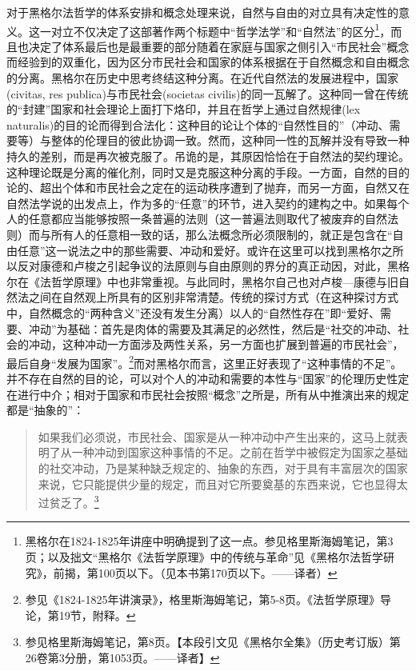 对于黑格尔法哲学的体系安排和概念处理来说，自然与自由的对立具有决定性的意义。这一对立不仅决定了这部著作两个标题中“哲学法学”和“自然法”的区分\footnote{黑格尔在1824-1825年讲座中明确提到了这一点。参见格里斯海姆笔记，第3页；以及拙文“黑格尔《法哲学原理》中的传统与革命”见《黑格尔法哲学研究》，前揭，第100页以下。（见本书第170页以下。——译者）}，而且也决定了体系最后也是最重要的部分随着在家庭与国家之侧引入“市民社会”概念而经验到的双重化，因为区分市民社会和国家的体系根据在于自然概念和自由概念的分离。黑格尔在历史中思考终结这种分离。在近代自然法的发展进程中，国家(civitas, res publica)与市民社会(societas civilis)的同一瓦解了。这种同一曾在传统的“封建”国家和社会理论上面打下烙印，并且在哲学上通过自然规律(lex naturalis)的目的论而得到合法化：这种目的论让个体的“自然性目的”（冲动、需要等）与整体的伦理目的彼此协调一致。然而，这种同一性的瓦解并没有导致一种持久的差别，而是再次被克服了。吊诡的是，其原因恰恰在于自然法的契约理论。这种理论既是分离的催化剂，同时又是克服这种分离的手段。一方面，自然的目的论的、超出个体和市民社会之定在的运动秩序遭到了抛弃，而另一方面，自然又在自然法学说的出发点上，作为多的“任意”的环节，进入契约的建构之中。如果每个人的任意都应当能够按照一条普遍的法则（这一普遍法则取代了被废弃的自然法则）而与所有人的任意相一致的话，那么法概念所必须限制的，就正是包含在“自由任意”这一说法之中的那些需要、冲动和爱好。或许在这里可以找到黑格尔之所以反对康德和卢梭之引起争议的法原则与自由原则的界分的真正动因，对此，黑格尔在《法哲学原理》中也非常重视。与此同时，黑格尔自己也对卢梭—康德与旧自然法之间在自然观上所具有的区别非常清楚。传统的探讨方式（在这种探讨方式中，自然概念的“两种含义”还没有发生分离）以人的“自然性存在”即“爱好、需要、冲动”为基础：首先是肉体的需要及其满足的必然性，然后是“社交的冲动、社会的冲动，这种冲动一方面涉及两性关系，另一方面也扩展到普遍的市民社会”，最后自身“发展为国家”。\footnote{参见《1824-1825年讲演录》，格里斯海姆笔记，第5-8页。《法哲学原理》导论，第19节，附释。}而对黑格尔而言，这里正好表现了“这种事情的不足”。并不存在自然的目的论，可以对个人的冲动和需要的本性与“国家”的伦理历史性定在进行中介；相对于国家和市民社会按照“概念”之所是，所有从中推演出来的规定都是“抽象的”：

\begin{quote}
如果我们必须说，市民社会、国家是从一种冲动中产生出来的，这马上就表明了从一种冲动到国家这种事情的不足。之前在哲学中被假定为国家之基础的社交冲动，乃是某种缺乏规定的、抽象的东西，对于具有丰富层次的国家来说，它只能提供少量的规定，而且对它所要奠基的东西来说，它也显得太过贫乏了。\footnote{参见格里斯海姆笔记，第8页。【本段引文见《黑格尔全集》（历史考订版）第26卷第3分册，第1053页。——译者】}
\end{quote}

